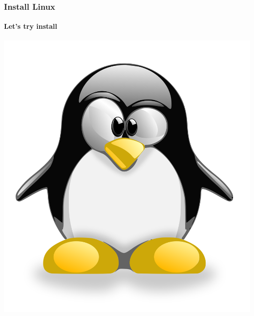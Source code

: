 \documentclass[unknownkeysallowed, 10pt, a4 paper, handout]{beamer}
\begin{document}
\begin{frame}[label=install]
  \frametitle{Install Linux}
  \framesubtitle{Let's try install}
  \begin{center}
    \includegraphics[scale=0.11]{pics/TUX_G2.svg.png}
  \end{center}
\end{frame}
\end{document}
